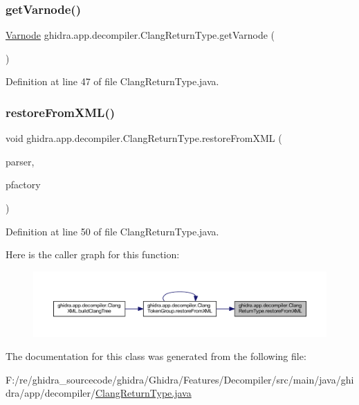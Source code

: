 \subsubsection{\texorpdfstring{getVarnode()}{getVarnode()}}
{\footnotesize\ttfamily \mbox{\hyperlink{class_varnode}{Varnode}} ghidra.\+app.\+decompiler.\+Clang\+Return\+Type.\+get\+Varnode (\begin{DoxyParamCaption}\item[{void}]{ }\end{DoxyParamCaption})\hspace{0.3cm}{\ttfamily [inline]}}



Definition at line 47 of file Clang\+Return\+Type.\+java.

\mbox{\label{classghidra_1_1app_1_1decompiler_1_1_clang_return_type_a5bdc24c2df8e80697cec876a033fc222}} 
\subsubsection{\texorpdfstring{restoreFromXML()}{restoreFromXML()}}
{\footnotesize\ttfamily void ghidra.\+app.\+decompiler.\+Clang\+Return\+Type.\+restore\+From\+X\+ML (\begin{DoxyParamCaption}\item[{Xml\+Pull\+Parser}]{parser,  }\item[{Pcode\+Factory}]{pfactory }\end{DoxyParamCaption})\hspace{0.3cm}{\ttfamily [inline]}}



Definition at line 50 of file Clang\+Return\+Type.\+java.

Here is the caller graph for this function\+:
\nopagebreak
\begin{figure}[H]
\begin{center}
\leavevmode
\includegraphics[width=350pt]{classghidra_1_1app_1_1decompiler_1_1_clang_return_type_a5bdc24c2df8e80697cec876a033fc222_icgraph}
\end{center}
\end{figure}


The documentation for this class was generated from the following file\+:\begin{DoxyCompactItemize}
\item 
F\+:/re/ghidra\+\_\+sourcecode/ghidra/\+Ghidra/\+Features/\+Decompiler/src/main/java/ghidra/app/decompiler/\mbox{\hyperlink{_clang_return_type_8java}{Clang\+Return\+Type.\+java}}\end{DoxyCompactItemize}
